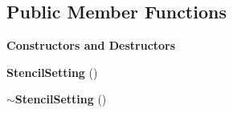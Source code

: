\subsection*{Public Member Functions}
\begin{Indent}\textbf{ Constructors and Destructors}\par
\begin{DoxyCompactItemize}
\item 
\mbox{\label{classrev_1_1_stencil_setting_a41d45273a9f0646fee302f20d765f4ec}} 
{\bfseries Stencil\+Setting} ()
\item 
\mbox{\label{classrev_1_1_stencil_setting_a10aad7e80bb17fcb5edd0ae39c34be97}} 
{\bfseries $\sim$\+Stencil\+Setting} ()
\end{DoxyCompactItemize}
\end{Indent}
